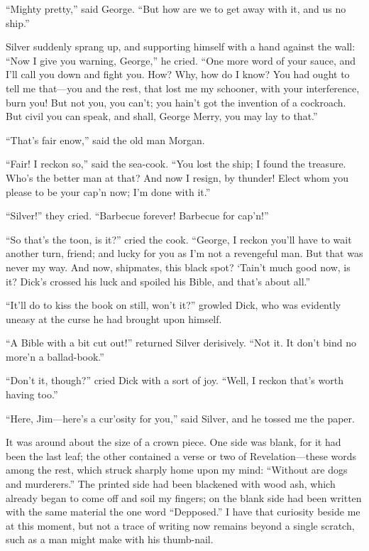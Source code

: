 \enquote{Mighty pretty,} said George. \enquote{But how are we to get away with it, and us no ship.}

Silver suddenly sprang up, and supporting himself with a hand against the wall: \enquote{Now I give you warning, George,} he cried. \enquote{One more word of your sauce, and I’ll call you down and fight you. How? Why, how do I know? You had ought to tell me that---you and the rest, that lost me my schooner, with your interference, burn you! But not you, you can’t; you hain’t got the invention of a cockroach. But civil you can speak, and shall, George Merry, you may lay to that.}

\enquote{That’s fair enow,} said the old man Morgan.

\enquote{Fair! I reckon so,} said the sea-cook. \enquote{You lost the ship; I found the treasure. Who’s the better man at that? And now I resign, by thunder! Elect whom you please to be your cap’n now; I’m done with it.}

\enquote{Silver!} they cried. \enquote{Barbecue forever! Barbecue for cap’n!}

\enquote{So that’s the toon, is it?} cried the cook. \enquote{George, I reckon you’ll have to wait another turn, friend; and lucky for you as I’m not a revengeful man. But that was never my way. And now, shipmates, this black spot? `Tain’t much good now, is it? Dick’s crossed his luck and spoiled his Bible, and that’s about all.}

\enquote{It’ll do to kiss the book on still, won’t it?} growled Dick, who was evidently uneasy at the curse he had brought upon himself.

\enquote{A Bible with a bit cut out!} returned Silver derisively. \enquote{Not it. It don’t bind no more’n a ballad-book.}

\enquote{Don’t it, though?} cried Dick with a sort of joy. \enquote{Well, I reckon that’s worth having too.}

\enquote{Here, Jim---here’s a cur’osity for you,} said Silver, and he tossed me the paper.

It was around about the size of a crown piece. One side was blank, for it had been the last leaf; the other contained a verse or two of Revelation---these words among the rest, which struck sharply home upon my mind: \enquote{Without are dogs and murderers.} The printed side had been blackened with wood ash, which already began to come off and soil my fingers; on the blank side had been written with the same material the one word \enquote{Depposed.} I have that curiosity beside me at this moment, but not a trace of writing now remains beyond a single scratch, such as a man might make with his thumb-nail.

